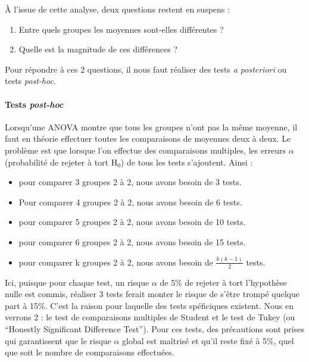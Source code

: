 \documentclass[
  a4paper,
]{article}
\providecommand{\tightlist}{%
  \setlength{\itemsep}{0pt}\setlength{\parskip}{0pt}}
\begin{document}
À l'issue de cette analyse, deux questions restent en suspens :

\begin{enumerate}
\def\labelenumi{\arabic{enumi}.}
\tightlist
\item
  Entre quels groupes les moyennes sont-elles différentes ?
\item
  Quelle est la magnitude de ces différences ?
\end{enumerate}

Pour répondre à ces 2 questions, il nous faut réaliser des tests \emph{a posteriori} ou tests \emph{post-hoc}.

\hypertarget{tests-post-hoc}{%
\paragraph{\texorpdfstring{Tests \emph{post-hoc}}{Tests post-hoc}}\label{tests-post-hoc}}

Lorsqu'une ANOVA montre que tous les groupes n'ont pas la même moyenne, il faut en théorie effectuer toutes les comparaisons de moyennes deux à deux. Le problème est que lorsque l'on effectue des comparaisons multiples, les erreurs \(\alpha\) (probabilité de rejeter à tort H\(_0\)) de tous les tests s'ajoutent. Ainsi :

\begin{itemize}
\tightlist
\item
  pour comparer 3 groupes 2 à 2, nous avons besoin de 3 tests.
\item
  Pour comparer 4 groupes 2 à 2, nous avons besoin de 6 tests.
\item
  pour comparer 5 groupes 2 à 2, nous avons besoin de 10 tests.
\item
  pour comparer 6 groupes 2 à 2, nous avons besoin de 15 tests.
\item
  pour comparer k groupes 2 à 2, nous avons besoin de \(\frac{k(k-1)}{2}\) tests.
\end{itemize}

Ici, puisque pour chaque test, un risque \(\alpha\) de 5\% de rejeter à tort l'hypothèse nulle est commis, réaliser 3 tests ferait monter le risque de s'être trompé quelque part à 15\%. C'est la raison pour laquelle des tests spéficiques existent. Nous en verrons 2 : le test de comparaisons multiples de Student et le test de Tukey (ou ``Honestly Significant Difference Test''). Pour ces tests, des précautions sont prises qui garantissent que le risque \(\alpha\) global est maîtrisé et qu'il reste fixé à 5\%, quel que soit le nombre de comparaisons effectuées.
\end{document}
